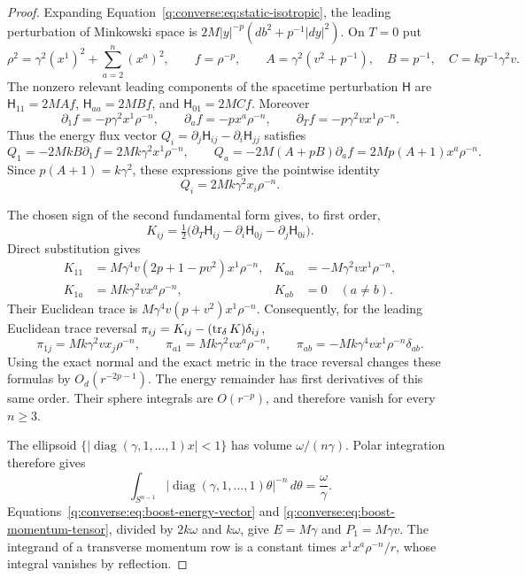 \begin{proof}
Expanding Equation~\eqref{q:converse:eq:static-isotropic}, the leading
perturbation of Minkowski space is
$2M|y|^{-p}(db^2+p^{-1}|dy|^2)$.  On $T=0$ put
\[
 \rho^2=\gamma^2(x^1)^2+\sum_{a=2}^n(x^a)^2,\qquad f=\rho^{-p},
 \qquad A=\gamma^2(v^2+p^{-1}),\quad B=p^{-1},\quad
 C=kp^{-1}\gamma^2v.
\]
The nonzero relevant leading components of the spacetime perturbation
$\mathsf H$ are
$\mathsf H_{11}=2MAf$, $\mathsf H_{aa}=2MBf$, and
$\mathsf H_{01}=2MCf$.  Moreover
\[
 \partial_1f=-p\gamma^2x^1\rho^{-n},\qquad
 \partial_af=-px^a\rho^{-n},\qquad
 \partial_Tf=-p\gamma^2vx^1\rho^{-n}.
\]
Thus the energy flux vector $Q_i=\partial_j\mathsf H_{ij}
-\partial_i\mathsf H_{jj}$ satisfies
\[
 Q_1=-2MkB\partial_1f=2Mk\gamma^2x^1\rho^{-n},\qquad
 Q_a=-2M(A+pB)\partial_af=2Mp(A+1)x^a\rho^{-n}.
\]
Since $p(A+1)=k\gamma^2$, these expressions give the pointwise identity
\begin{equation}\label{q:converse:eq:boost-energy-vector}
 Q_i=2Mk\gamma^2x_i\rho^{-n}.
\end{equation}

The chosen sign of the second fundamental form gives, to first order,
\[
 K_{ij}=\tfrac12\bigl(\partial_T\mathsf H_{ij}
                 -\partial_i\mathsf H_{0j}
                 -\partial_j\mathsf H_{0i}\bigr).
\]
Direct substitution gives
\begin{align*}
 K_{11}&=M\gamma^4v(2p+1-pv^2)x^1\rho^{-n},&
 K_{aa}&=-M\gamma^2vx^1\rho^{-n},\\
 K_{1a}&=Mk\gamma^2vx^a\rho^{-n},&
 K_{ab}&=0\quad(a\ne b).
\end{align*}
Their Euclidean trace is
$M\gamma^4v(p+v^2)x^1\rho^{-n}$.  Consequently, for the leading
Euclidean trace reversal $\pi_{ij}=K_{ij}-(\operatorname{tr}_\delta K)\delta_{ij}$,
\begin{equation}\label{q:converse:eq:boost-momentum-tensor}
 \pi_{1j}=Mk\gamma^2v x_j\rho^{-n},\qquad
 \pi_{a1}=Mk\gamma^2vx^a\rho^{-n},\qquad
 \pi_{ab}=-Mk\gamma^4vx^1\rho^{-n}\delta_{ab}.
\end{equation}
Using the exact normal and the exact metric in the trace reversal
changes these formulas by $O_d(r^{-2p-1})$.  The energy remainder
has first derivatives of this same order.  Their sphere integrals
are $O(r^{-p})$, and therefore vanish for every $n\ge3$.

The ellipsoid $\{|\operatorname{diag}(\gamma,1,\ldots,1)x|<1\}$
has volume $\omega/(n\gamma)$.  Polar integration therefore gives
\begin{equation}\label{q:converse:eq:ellipsoid-integral}
 \int_{S^{n-1}}|\operatorname{diag}(\gamma,1,\ldots,1)\theta|^{-n}
 \,d\theta=\frac{\omega}{\gamma}.
\end{equation}
Equations~\eqref{q:converse:eq:boost-energy-vector} and
\eqref{q:converse:eq:boost-momentum-tensor}, divided by $2k\omega$ and
$k\omega$, give $E=M\gamma$ and $P_1=M\gamma v$.
The integrand of a transverse momentum row is a constant times
$x^1x^a\rho^{-n}/r$, whose integral vanishes by reflection.
\end{proof}

